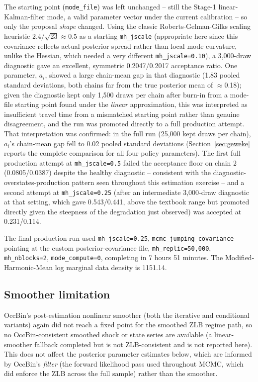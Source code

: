 \documentclass[11pt]{article}
\begin{document}
The starting point (\texttt{mode\_file}) was left unchanged -- still the
Stage-1 linear-Kalman-filter mode, a valid parameter vector under the
current calibration -- so only the proposal \emph{shape} changed. Using
the classic Roberts-Gelman-Gilks scaling heuristic
$2.4/\sqrt{23}\approx0.5$ as a starting \texttt{mh\_jscale} (appropriate
here since this covariance reflects actual posterior spread rather than
local mode curvature, unlike the Hessian, which needed a very different
\texttt{mh\_jscale=0.10}), a 3{,}000-draw diagnostic gave an excellent,
symmetric 0.2047/0.2017 acceptance ratio. One parameter, $a_i$, showed a
large chain-mean gap in that diagnostic (1.83 pooled standard
deviations, both chains far from the true posterior mean of
$\approx$0.18); given the diagnostic kept only 1{,}500 draws per chain
after burn-in from a mode-file starting point found under the
\emph{linear} approximation, this was interpreted as insufficient
travel time from a mismatched starting point rather than genuine
disagreement, and the run was promoted directly to a full production
attempt. That interpretation was confirmed: in the full run (25{,}000
kept draws per chain), $a_i$'s chain-mean gap fell to 0.02 pooled
standard deviations (Section~\ref{sec:geweke} reports the complete
comparison for all four policy parameters). The first full production
attempt at \texttt{mh\_jscale=0.5} failed the acceptance floor on chain
2 (0.0805/0.0387) despite the healthy diagnostic -- consistent with the
diagnostic-overstates-production pattern seen throughout this
estimation exercise -- and a second attempt at \texttt{mh\_jscale=0.25}
(after an intermediate 3{,}000-draw diagnostic at that setting, which
gave 0.543/0.441, above the textbook range but promoted directly given
the steepness of the degradation just observed) was accepted at
0.231/0.114.

The final production run used \texttt{mh\_jscale=0.25},
\texttt{mcmc\_jumping\_covariance} pointing at the custom
posterior-covariance file, \texttt{mh\_replic=50{,}000},
\texttt{mh\_nblocks=2}, \texttt{mode\_compute=0}, completing in 7 hours
51 minutes. The Modified-Harmonic-Mean log marginal data density is
1151.14.

\subsection{Smoother limitation}
\label{sec:zlb-detection}
OccBin's post-estimation nonlinear smoother (both the iterative and
conditional variants) again did not reach a fixed point for the
smoothed ZLB regime path, so no OccBin-consistent smoothed shock or
state series are available (a linear-smoother fallback completed but is
not ZLB-consistent and is not reported here). This does not affect the
posterior parameter estimates below, which are informed by OccBin's
\emph{filter} (the forward likelihood pass used throughout MCMC, which
did enforce the ZLB across the full sample) rather than the smoother.
\end{document}
